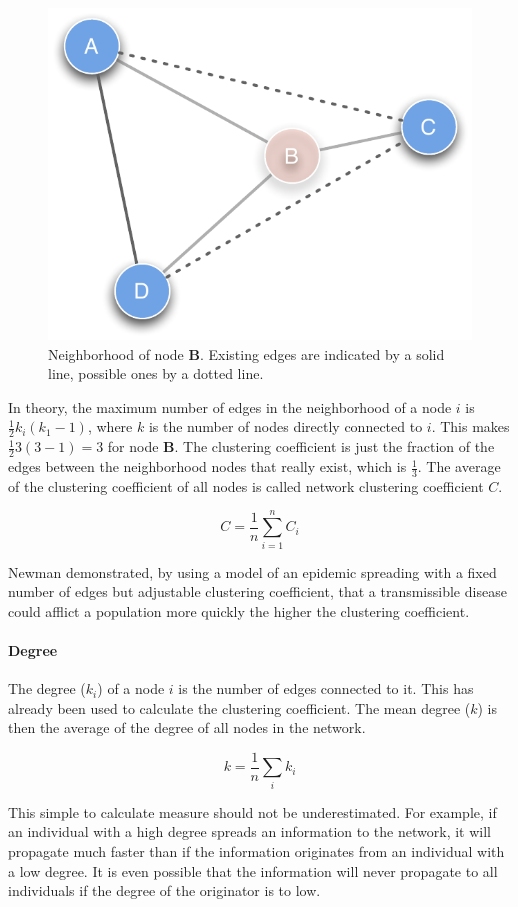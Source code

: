 \begin{figure}[htpb]
\begin{center}
  \includegraphics[width=.33\textwidth]{assets/pdf/clustering_coefficient.pdf}
  \caption[Neighborhood of node \textit{B}]{Neighborhood of node \textbf{B}. Existing edges are indicated by a solid line, possible ones by a dotted line.}
  \label{fig:clust_coeff}
\end{center}
\end{figure}

In theory, the maximum number of edges in the neighborhood of a node $i$ is $\frac{1}{2}k_i(k_1 -1)$, where $k$ is the number of nodes directly connected to $i$. This makes $\frac{1}{2}3(3 -1) = 3$ for node \textbf{B}. The clustering coefficient is just the fraction of the edges between the neighborhood nodes that really exist, which is $\frac{1}{3}$. The average of the clustering coefficient of all nodes is called network clustering coefficient $C$.

\begin{equation}
C = \frac{1}{n}\sum^n_{i=1}C_i
\end{equation}  

Newman\cite{newman:2003} demonstrated, by using a model of an epidemic spreading with a fixed number of edges but adjustable clustering coefficient, that a transmissible disease could afflict a population more quickly the higher the clustering coefficient.
     
\paragraph{Degree}

The degree ($k_i$) of a node $i$ is the number of edges connected to it. This has already been used to calculate the clustering coefficient. The mean degree ($k$) is then the average of the degree of all nodes in the network.

\begin{equation}
k = \frac{1}{n}\sum_i k_i
\end{equation}

This simple to calculate measure should not be underestimated. For example, if an individual with a high degree spreads an information to the network, it will propagate much faster than if the information originates from an individual with a low degree. It is even possible that the information will never propagate to all individuals if the degree of the originator is to low.

